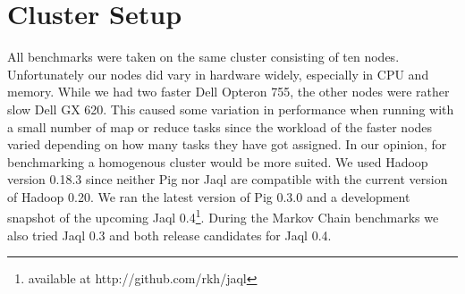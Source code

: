 \section{Cluster Setup}

All benchmarks were taken on the same cluster consisting of ten nodes. Unfortunately our nodes did vary in hardware widely, especially in CPU and memory. While we had two faster Dell Opteron 755, the other nodes were rather slow Dell GX 620. This caused some variation in performance when running with a small number of map or reduce tasks since the workload of the faster nodes varied depending on how many tasks they have got assigned. In our opinion, for benchmarking a homogenous cluster would be more suited. We used Hadoop version 0.18.3 since neither Pig nor Jaql are compatible with the current version of Hadoop 0.20. We ran the latest version of Pig 0.3.0 and a development snapshot of the upcoming Jaql 0.4\footnote{available at http://github.com/rkh/jaql}. During the Markov Chain benchmarks we also tried Jaql 0.3 and both release candidates for Jaql 0.4.